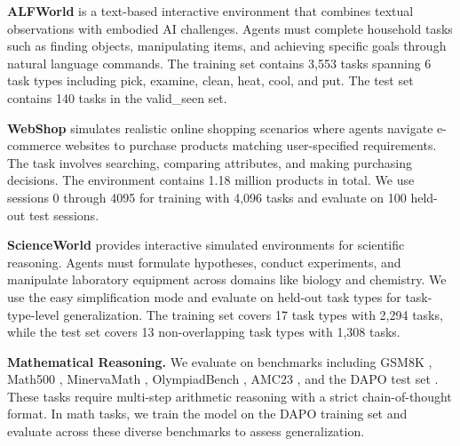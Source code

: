 \textbf{ALFWorld} \cite{shridhar2020alfworld} is a text-based interactive environment that combines textual observations with embodied AI challenges. Agents must complete household tasks such as finding objects, manipulating items, and achieving specific goals through natural language commands. The training set contains 3,553 tasks spanning 6 task types including pick, examine, clean, heat, cool, and put. The test set contains 140 tasks in the valid\_seen set.

\textbf{WebShop} \cite{yao2022webshop} simulates realistic online shopping scenarios where agents navigate e-commerce websites to purchase products matching user-specified requirements. The task involves searching, comparing attributes, and making purchasing decisions. The environment contains 1.18 million products in total. We use sessions 0 through 4095 for training with 4,096 tasks and evaluate on 100 held-out test sessions.

\textbf{ScienceWorld} \cite{wang2022scienceworld} provides interactive simulated environments for scientific reasoning. Agents must formulate hypotheses, conduct experiments, and manipulate laboratory equipment across domains like biology and chemistry. We use the easy simplification mode and evaluate on held-out task types for task-type-level generalization. The training set covers 17 task types with 2,294 tasks, while the test set covers 13 non-overlapping task types with 1,308 tasks.

\textbf{Mathematical Reasoning.} We evaluate on benchmarks including GSM8K \cite{cobbe2021training}, Math500 \cite{lightman2023let}, MinervaMath \cite{lewkowycz2022solving}, OlympiadBench \cite{gao2024omni}, AMC23 \cite{amc}, and the DAPO test set \cite{yu2025dapo}. These tasks require multi-step arithmetic reasoning with a strict chain-of-thought format. In math tasks, we train the model on the DAPO training set and evaluate across these diverse benchmarks to assess generalization.


